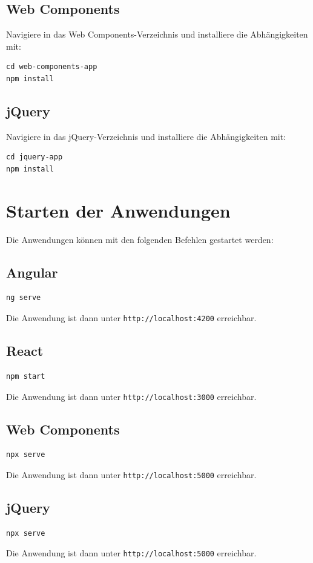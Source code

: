 \documentclass[oneside]{ausarbeitung}
\begin{document}
\subsection{Web Components}
Navigiere in das Web Components-Verzeichnis und installiere die Abhängigkeiten mit:
\begin{verbatim}
cd web-components-app
npm install
\end{verbatim}

\subsection{jQuery}
Navigiere in das jQuery-Verzeichnis und installiere die Abhängigkeiten mit:
\begin{verbatim}
cd jquery-app
npm install
\end{verbatim}

\section{Starten der Anwendungen}
Die Anwendungen können mit den folgenden Befehlen gestartet werden:

\subsection{Angular}
\begin{verbatim}
ng serve
\end{verbatim}
Die Anwendung ist dann unter \texttt{http://localhost:4200} erreichbar.

\subsection{React}
\begin{verbatim}
npm start
\end{verbatim}
Die Anwendung ist dann unter \texttt{http://localhost:3000} erreichbar.

\subsection{Web Components}
\begin{verbatim}
npx serve
\end{verbatim}
Die Anwendung ist dann unter \texttt{http://localhost:5000} erreichbar.

\subsection{jQuery}
\begin{verbatim}
npx serve
\end{verbatim}
Die Anwendung ist dann unter \texttt{http://localhost:5000} erreichbar.
\end{document}
